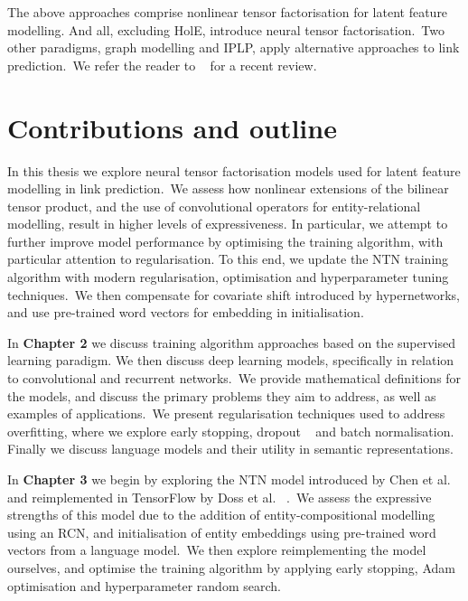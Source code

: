 \noindent The above approaches comprise nonlinear tensor factorisation for latent feature modelling. And all, excluding HolE, introduce neural tensor factorisation.\ Two other paradigms, graph modelling and IPLP, apply alternative approaches to link prediction.\ We refer the reader to \unskip~\citep{nickel2015review} for a recent review. \par



\section{Contributions and outline} %

\noindent In this thesis we explore neural tensor factorisation models used for latent feature modelling in link prediction.\ We assess how nonlinear extensions of the bilinear tensor product, and the use of convolutional operators for entity-relational modelling, result in higher levels of expressiveness. In particular, we attempt to further improve model performance by optimising the training algorithm, with particular attention to regularisation. To this end, we update the NTN training algorithm with modern regularisation, optimisation and hyperparameter tuning techniques.\ We then compensate for covariate shift introduced by hypernetworks, and use pre-trained word vectors for embedding in initialisation. \par

\noindent In \textbf{Chapter 2} we discuss training algorithm approaches based on the supervised learning paradigm. We then discuss deep learning models, specifically in relation to convolutional and recurrent networks.\ We provide mathematical definitions for the models, and discuss the primary problems they aim to address, as well as examples of applications.\ We present regularisation techniques used to address overfitting, where we explore early stopping, dropout \unskip ~\citep{srivastava2014dropout} and batch normalisation. Finally we discuss language models and their utility in semantic representations. \par

\noindent In \textbf{Chapter 3} we begin by exploring the NTN model introduced by Chen et al. \unskip ~\citep{socher2013reasoning} and reimplemented in TensorFlow by Doss et al. \unskip ~\citep{Doss2015}.\ We assess the expressive strengths of this model due to the addition of entity-compositional modelling using an RCN, and initialisation of entity embeddings using pre-trained word vectors from a language model.\ We then explore reimplementing the model ourselves, and optimise the training algorithm by applying early stopping, Adam optimisation and hyperparameter random search. \par

